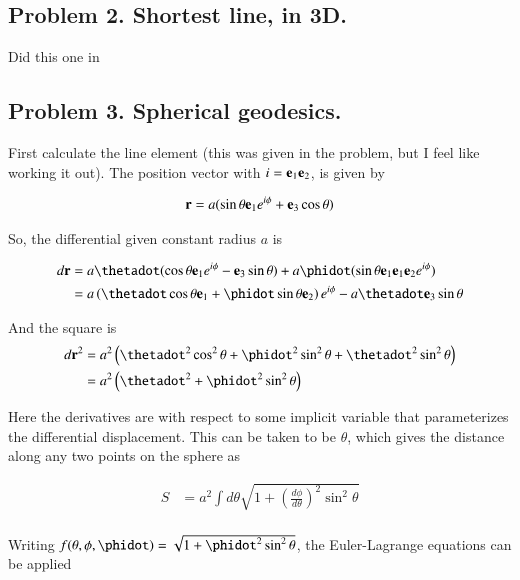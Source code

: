 \documentclass{article}
\begin{document}
\subsection{ Problem 2. Shortest line, in 3D. }

Did this one in \cite{PJgoldch1}

\subsection{ Problem 3.  Spherical geodesics. }

First calculate the line element (this was given in the problem, but I feel like working it out).
The position vector with $i = \mathbf{e}_1 \mathbf{e}_2$, is given by

\begin{align*}
\mathbf{r} = a ( \sin\theta \mathbf{e}_1 e^{i\phi} + \mathbf{e}_3 \cos\theta )
\end{align*}

So, the differential given constant radius $a$ is

\begin{align*}
d\Br 
&= 
a \thetadot ( \cos\theta \Be_1 e^{i\phi} - \Be_3 \sin\theta )
+ a \phidot ( \sin\theta \Be_1 \Be_1 \Be_2 e^{i\phi} ) \\
&= 
a \left( \thetadot \cos\theta \Be_1 + \phidot \sin\theta \Be_2 \right) e^{i\phi} - a \thetadot \Be_3 \sin\theta \\
\end{align*}

And the square is
\begin{align*}
d\Br^2
&= a^2 \left( \thetadot^2 \cos^2\theta + \phidot^2 \sin^2\theta + \thetadot^2 \sin^2\theta \right) \\
&= a^2 \left( \thetadot^2 + \phidot^2 \sin^2\theta \right) \\
\end{align*}

Here the derivatives are with respect to some implicit variable that parameterizes the differential displacement.
This can be taken to be $\theta$, which gives the distance along any two points on the sphere as

\begin{align*}
S &= a^2 \int d\theta \sqrt{1 + \left(\frac{d\phi}{d\theta}\right)^2 \sin^2\theta } \\
\end{align*}

Writing $f(\theta, \phi, \phidot) = \sqrt{1 + \phidot^2 \sin^2\theta}$, the Euler-Lagrange equations can be
applied
\end{document}
